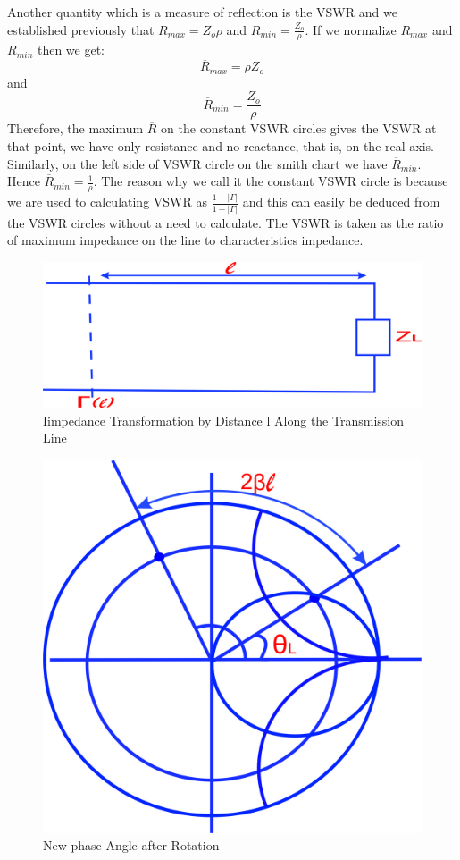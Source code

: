 Another quantity which is a measure of reflection is the VSWR and we established previously that $R_{max} = Z_{o}\rho$ and $R_{min} = \frac{Z_o}{\rho}$. If we normalize $R_{max}$ and $R_{min}$ then we get:
\begin{equation}
\overline{R}_{max} = {\rho}Z_o 
\end{equation}
and
\begin{equation}
\overline{R}_{min} = \frac{Z_o}{\rho}
\end{equation}
Therefore, the maximum $\overline{R}$ on the constant VSWR circles gives the VSWR at that point, we have only resistance and no reactance, that is, on the real axis. Similarly, on the left side of VSWR circle on the smith chart we have $\overline{R}_{min}$. Hence $\overline{R}_{min} = \frac{1}{\rho}$. The reason why we call it the constant VSWR circle is because we are used to calculating VSWR as $\frac{1 + |\Gamma|}{1 - |\Gamma|}$ and this can easily be deduced from the VSWR circles without a need to calculate.
The VSWR is taken as the ratio of maximum impedance on the line to characteristics impedance.
\begin{figure}[h]
\centering
\includegraphics[width=0.7\linewidth]{./graphics/wertuyuk}
\caption{Iimpedance Transformation by Distance l Along the Transmission Line}
\label{fig:wertuyuk}
\end{figure}
\begin{figure}[h]
\centering
\includegraphics[width=0.5\linewidth]{./graphics/uyhbgjvkclxse}
\caption{New phase Angle after Rotation}
\label{fig:uyhbgjvkclxse}
\end{figure}


